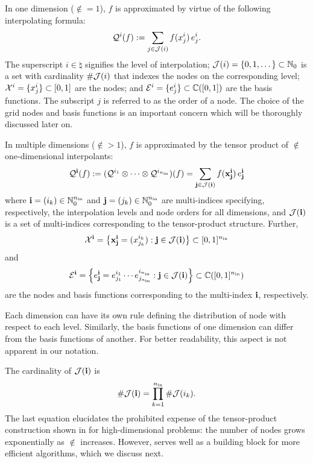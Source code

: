In one dimension ($\nin = 1$), $f$ is approximated by virtue of the following
interpolating formula:
\[
  \mathcal{Q}^{i}(f) := \sum_{j \in \mathcal{J}(i)} f(x^i_j) \, e^i_j.
\]
The superscript $i \in \natural$ signifies the level of interpolation;
$\mathcal{J}(i) = \{ 0, 1, \dots \} \subset \mathbb{N}_0$ is a set with cardinality
$\# \mathcal{J}(i)$ that indexes the nodes on the corresponding level;
$\mathcal{X}^i = \{ x^i_j \} \subset [0, 1]$ are the nodes; and $\mathcal{E}^i = \{ e^i_j \}
\subset \mathbb{C}([0, 1])$ are the basis functions. The subscript $j$ is
referred to as the order of a node. The choice of the grid nodes and basis
functions is an important concern which will be thoroughly discussed later on.

In multiple dimensions ($\nin > 1$), $f$ is approximated by the tensor product
of $\nin$ one-dimensional interpolants:
\begin{equation} \elab{tensor-product}
  \tensor{\vi}(f) := (\tensor{i_1} \otimes \cdots \otimes \tensor{i_\nin})(f) = \sum_{\vj \in \index(\vi)} f(\v{x}^\vi_\vj) \, \e^\vi_\vj
\end{equation}
where $\mathbf{i} = (i_k) \in \mathbb{N}_0^{n_\text{in}}$ and $\mathbf{j} = (j_k) \in \mathbb{N}_0^{n_\text{in}}$ are
multi-indices specifying, respectively, the interpolation levels and node orders
for all dimensions, and $\mathcal{J}(\mathbf{i})$ is a set of multi-indices corresponding to
the tensor-product structure. Further,
\[
  \mathcal{X}^{\mathbf{i}} = \left\{ \mathbf{x}^{\mathbf{i}}_{\mathbf{j}} = (x^{i_k}_{j_k}): \mathbf{j} \in \mathcal{J}(\mathbf{i}) \right\} \subset [0, 1]^{n_\text{in}}
\]
and
\[
  \mathcal{E}^{\mathbf{i}} = \left\{ e^{\mathbf{i}}_{\mathbf{j}} = e^{i_1}_{j_1} \cdots e^{i_{n_\text{in}}}_{j_{n_\text{in}}}: \mathbf{j} \in \mathcal{J}(\mathbf{i}) \right\} \subset \mathbb{C}([0, 1]^{n_\text{in}})
\]
are the nodes and basis functions corresponding to the multi-index $\mathbf{i}$,
respectively.
\begin{remark}
Each dimension can have its own rule defining the distribution of node with
respect to each level. Similarly, the basis functions of one dimension can
differ from the basis functions of another. For better readability, this aspect
is not apparent in our notation.
\end{remark}
The cardinality of $\mathcal{J}(\mathbf{i})$ is
\begin{equation} \elab{tensor-product-cardinality}
  \cardinality{\index(\vi)} = \prod_{k = 1}^\nin \cardinality{\index(i_k)}.
\end{equation}
The last equation elucidates the prohibited expense of the tensor-product
construction shown in  for high-dimensional problems: the
number of nodes grows exponentially as $\nin$ increases. However,
 serves well as a building block for more efficient
algorithms, which we discuss next.
